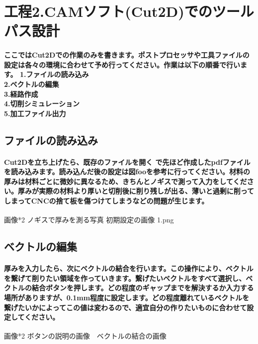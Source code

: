 \documentclass[b5paper, 9pt, twocolumn, titlepage,openany]{jsbook}%
\begin{document}
\section{工程2.CAMソフト(Cut2D)でのツールパス設計}
\paragraph{ここではCut2Dでの作業のみを書きます。ポストプロセッサや工具ファイルの設定は各々の環境に合わせて予め行ってください。作業は以下の順番で行います。
1.ファイルの読み込み\\
2.ベクトルの編集\\
3.経路作成\\
4.切削シミュレーション\\
5.加工ファイル出力}

\subsection{ファイルの読み込み}
\paragraph{Cut2Dを立ち上げたら、既存のファイルを開く で先ほど作成したpdfファイルを読み込みます。読み込んだ後の設定は図fooを参考に行ってください。材料の厚みは材料ごとに微妙に異なるため、きちんとノギスで測って入力をしてください。厚みが実際の材料より厚いと切削後に削り残しが出る、薄いと過剰に削ってしまってCNCの捨て板を傷つけてしまうなどの問題が生じます。}

画像*2 ノギスで厚みを測る写真 初期設定の画像 1.png

\subsection{ベクトルの編集}
\paragraph{厚みを入力したら、次にベクトルの結合を行います。この操作により、ベクトルを繋げて削りたい領域を作っていきます。繋げたいベクトルをすべて選択し、ベクトルの結合ボタンを押します。どの程度のギャップまでを解決するか入力する場所がありますが、0.1mm程度に設定します。どの程度離れているベクトルを繋げたいかによってこの値は変わるので、適宜自分の作りたいものに合わせて設定してください。}

画像*2 ボタンの説明の画像　ベクトルの結合の画像
\end{document}
